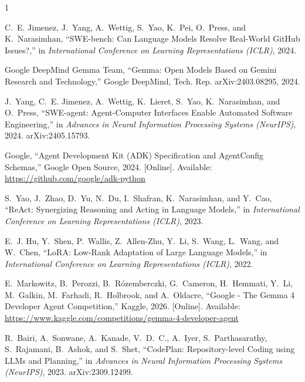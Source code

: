 \documentclass[10pt,twocolumn,letterpaper]{article}
\begin{document}

\begin{thebibliography}{1}

C.~E. Jimenez, J.~Yang, A.~Wettig, S.~Yao, K.~Pei, O.~Press, and K.~Narasimhan, ``{SWE-bench: Can Language Models Resolve Real-World GitHub Issues?},'' in \emph{International Conference on Learning Representations (ICLR)}, 2024.

{Google DeepMind Gemma Team}, ``{Gemma: Open Models Based on Gemini Research and Technology},'' Google DeepMind, Tech. Rep. arXiv:2403.08295, 2024.

J.~Yang, C.~E. Jimenez, A.~Wettig, K.~Lieret, S.~Yao, K.~Narasimhan, and O.~Press, ``{SWE-agent: Agent-Computer Interfaces Enable Automated Software Engineering},'' in \emph{Advances in Neural Information Processing Systems (NeurIPS)}, 2024. arXiv:2405.15793.

Google, ``{Agent Development Kit (ADK) Specification and AgentConfig Schemas},'' Google Open Source, 2024. [Online]. Available: \url{https://github.com/google/adk-python}

S.~Yao, J.~Zhao, D.~Yu, N.~Du, I.~Shafran, K.~Narasimhan, and Y.~Cao, ``{ReAct: Synergizing Reasoning and Acting in Language Models},'' in \emph{International Conference on Learning Representations (ICLR)}, 2023.

E.~J. Hu, Y.~Shen, P.~Wallis, Z.~Allen-Zhu, Y.~Li, S.~Wang, L.~Wang, and W.~Chen, ``{LoRA: Low-Rank Adaptation of Large Language Models},'' in \emph{International Conference on Learning Representations (ICLR)}, 2022.

E.~Markowitz, B.~Perozzi, B.~R{\'o}zemberczki, G.~Cameron, H.~Hemmati, Y.~Li, M.~Galkin, M.~Farhadi, R.~Holbrook, and A.~Oldacre, ``{Google - The Gemma 4 Developer Agent Competition},'' Kaggle, 2026. [Online]. Available: \url{https://www.kaggle.com/competitions/gemma-4-developer-agent}

R.~Bairi, A.~Sonwane, A.~Kanade, V.~D.~C., A.~Iyer, S.~Parthasarathy, S.~Rajamani, B.~Ashok, and S.~Shet, ``{CodePlan: Repository-level Coding using LLMs and Planning},'' in \emph{Advances in Neural Information Processing Systems (NeurIPS)}, 2023. arXiv:2309.12499.

\end{thebibliography}
\end{document}
